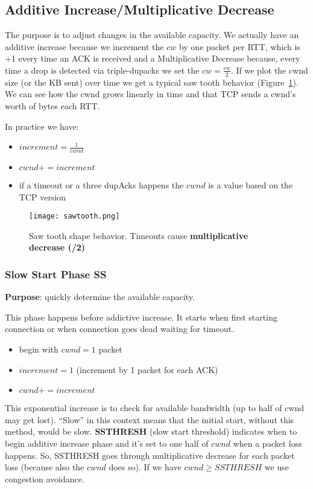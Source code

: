 \subsection{Additive Increase/Multiplicative Decrease}

The purpose is to adjust changes in the available capacity.
We actually have an additive increase because we increment the $cw$ by one
packet per RTT, which is +1 every time an ACK is received and a Multiplicative
Decrease because, every time a drop is detected via triple-dupacks we set the
$cw=\frac{cw}{2}$. If we plot the cwnd size (or the KB sent) over time we get a
typical saw tooth behavior (Figure~\ref{fig:tcp:sawtooth}). We can see how the
cwnd grows linearly in time and that TCP sends a cwnd's worth of bytes each RTT.

In practice we have:
\begin{itemize}
  \item $increment = \frac{1}{cwnd}$
  \item $cwnd += increment$
  \item if a timeout or a three dupAcks happens the $cwnd$ is a value based on
    the TCP version
\end{itemize}

\begin{figure}[t]
\texttt{[image: sawtooth.png]}
\caption[Saw tooth shape behavior]{Saw tooth shape behavior. Timeouts cause
  \textbf{multiplicative decrease (/2)}}
\label{fig:tcp:sawtooth}
\end{figure}

\subsubsection{Slow Start Phase SS}

\textbf{Purpose}: quickly determine the available capacity.

\noindent This phase happens before addictive increase. It starts when first
starting connection or when connection goes dead waiting for timeout.

\begin{itemize}
\item begin with $cwnd = 1$ packet
\item $increment = 1$  (increment by 1 packet for each ACK)
\item $cwnd += increment$
\end{itemize}

This exponential increase is to check for available bandwidth (up to half of
cwnd may get lost). ``Slow'' in this context means that the initial start,
without this method, would be slow.
\textbf{SSTHRESH} (slow start threshold) indicates when to begin additive
increase phase and it's set to one half of $cwnd$ when a packet loss happens.
So, SSTHRESH goes through multiplicative decrease for each packet loss (because
also the $cwnd$ does so).
If we have $cwnd \ge SSTHRESH$ we use congestion avoidance.

